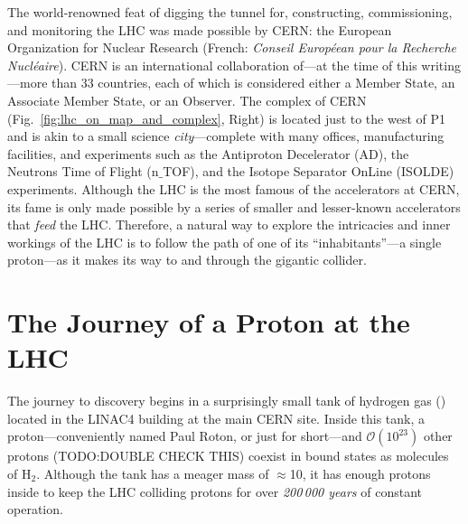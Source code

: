 The world-renowned feat of digging the tunnel for, constructing, commissioning, and monitoring the LHC was made possible by CERN:
the European Organization for Nuclear Research (French: \emph{Conseil Européean pour la Recherche Nucléaire}).
CERN is an international collaboration of---at the time of this writing---more than 33 countries,
each of which is considered either a Member State, an Associate Member State, or an Observer.
The complex of CERN (Fig.~\ref{fig:lhc_on_map_and_complex}, Right) is located just to the west of P1 and is akin to a small science \emph{city}---complete with many offices, manufacturing facilities, and experiments such as the Antiproton Decelerator (AD), the Neutrons Time of Flight (n$\_$TOF), and the Isotope Separator OnLine (ISOLDE) experiments.
Although the LHC is the most famous of the accelerators at CERN, its fame is only made possible by a series of smaller and lesser-known accelerators that \emph{feed} the LHC.
Therefore, a natural way to explore the intricacies and inner workings of the LHC is to follow the path of one of its ``inhabitants''---a single proton---as it makes its way to and through the gigantic collider.

\section{The Journey of a Proton at the LHC}
The journey to discovery begins in a surprisingly small tank of hydrogen gas (\htwo) located in the LINAC4 building at the main CERN site.
Inside this tank, a proton---conveniently named Paul Roton, or just \pname for short---and $\mathcal{O}(10^\text{23})$ other protons (TODO:DOUBLE CHECK THIS)
coexist in bound states as molecules of H$_2$.
Although the tank has a meager mass of 
$\approx$10\Kg,
it has enough protons inside to keep the LHC colliding protons for over \emph{200\,000 years} of constant operation.

